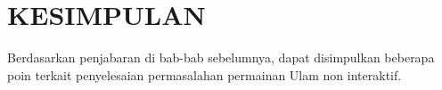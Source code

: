 \chapter{KESIMPULAN}

Berdasarkan penjabaran di bab-bab sebelumnya, dapat disimpulkan beberapa poin terkait penyelesaian permasalahan permainan Ulam non interaktif.

